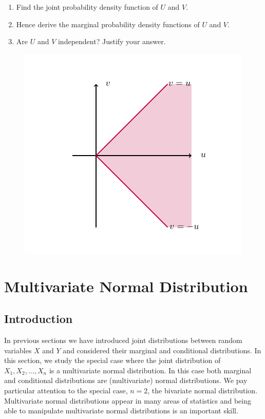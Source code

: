 \documentclass[
]{book}
\providecommand{\tightlist}{%
  \setlength{\itemsep}{0pt}\setlength{\parskip}{0pt}}
\begin{document}
\begin{enumerate}
\def\labelenumi{(\alph{enumi})}
\tightlist
\item
  Find the joint probability density function of \(U\) and \(V\).\\
\item
  Hence derive the marginal probability density functions of \(U\) and \(V\).\\
\item
  Are \(U\) and \(V\) independent? Justify your answer.\\
\end{enumerate}

\begin{figure}
\includegraphics[width=0.7\linewidth]{Images/Transform2} \end{figure}

\hypertarget{MV_Normal}{%
\chapter{Multivariate Normal Distribution}\label{MV_Normal}}

\hypertarget{MV_Normal:intro}{%
\section{Introduction}\label{MV_Normal:intro}}

In previous sections we have introduced joint distributions between random variables \(X\) and \(Y\) and considered their marginal and conditional distributions. In this section, we study the special case where the joint distribution of \(X_1, X_2, \ldots, X_n\) is a multivariate normal distribution. In this case both marginal and conditional distributions are (multivariate) normal distributions. We pay particular attention to the special case, \(n=2\), the bivariate normal distribution. Multivariate normal distributions appear in many areas of statistics and being able to manipulate multivariate normal distributions is an important skill.
\end{document}
